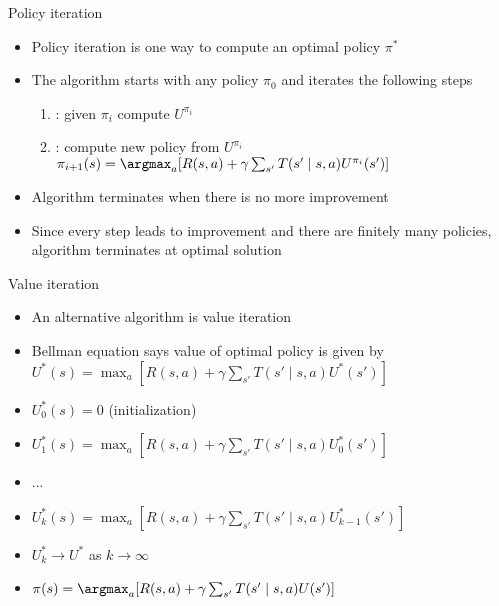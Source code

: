 \documentclass[handout]{dmu}
\begin{document}
\begin{frame}{Policy iteration}
\begin{itemize}
\item<1-> Policy iteration is one way to compute an optimal policy $\pi^*$
\item<2-> The algorithm starts with any policy $\pi_0$ and iterates the following steps
\begin{enumerate}
\item {}: given $\pi_i$ compute $U^{\pi_i}$
\item {}: compute new policy from $U^{\pi_i}$\\$\pi_{i+1}(s) = \argmax_a [ R(s, a) + \gamma \sum_{s'} T(s' \mid s, a) U^{\pi_i}(s')]$
\end{enumerate}
\item<3-> Algorithm terminates when there is no more improvement
\item<4-> Since every step leads to improvement and there are finitely many policies, algorithm terminates at optimal solution
\end{itemize}
\end{frame}

\begin{frame}{Value iteration}
\begin{itemize}
\item<1-> An alternative algorithm is \alert<1>{value iteration}
\item<2-> \alert<2>{Bellman equation} says value of optimal policy is given by\\$U^*(s) = \max_a [R(s, a) + \gamma \sum_{s'} T(s' \mid s, a) U^*(s')]$
\item<3-> $U^*_0(s) = 0$ (initialization)
\item<4-> $U^*_1(s) = \max_a [R(s, a) + \gamma \sum_{s'} T(s' \mid s, a) U_0^*(s')]$
\item<5-> ...
\item<5-> $U^*_k(s) = \max_a [R(s, a) + \gamma \sum_{s'} T(s' \mid s, a) U_{k-1}^*(s')]$
\item<6-> $U^*_k \rightarrow U^*$ as $k \rightarrow \infty$
\item<7-> $\pi(s) = \argmax_a [R(s, a) + \gamma \sum_{s'} T(s' \mid s, a) U(s')]$
\end{itemize}
\end{frame}
\end{document}

